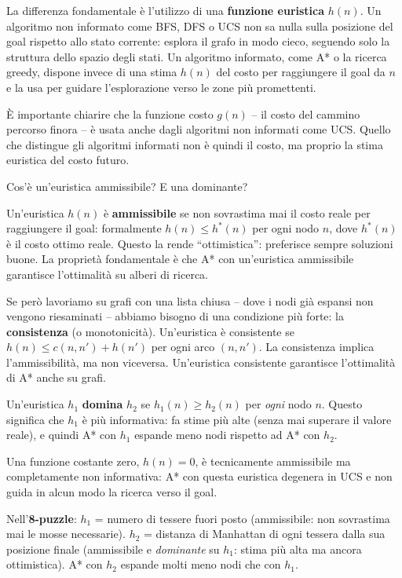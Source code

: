 \documentclass[12pt,a4paper]{article}
\begin{document}
La differenza fondamentale è l'utilizzo di una \textbf{funzione euristica} $h(n)$. Un algoritmo non informato come BFS, DFS o UCS non sa nulla sulla posizione del goal rispetto allo stato corrente: esplora il grafo in modo cieco, seguendo solo la struttura dello spazio degli stati. Un algoritmo informato, come A* o la ricerca greedy, dispone invece di una stima $h(n)$ del costo per raggiungere il goal da $n$ e la usa per guidare l'esplorazione verso le zone più promettenti.

È importante chiarire che la funzione costo $g(n)$ -- il costo del cammino percorso finora -- è usata anche dagli algoritmi non informati come UCS. Quello che distingue gli algoritmi informati non è quindi il costo, ma proprio la stima euristica del costo futuro.

\begin{domandabox}{Cos'è un'euristica ammissibile? E una dominante?}
\end{domandabox}

Un'euristica $h(n)$ è \textbf{ammissibile} se non sovrastima mai il costo reale per raggiungere il goal: formalmente $h(n) \leq h^*(n)$ per ogni nodo $n$, dove $h^*(n)$ è il costo ottimo reale. Questo la rende ``ottimistica'': preferisce sempre soluzioni buone. La proprietà fondamentale è che A* con un'euristica ammissibile garantisce l'ottimalità su alberi di ricerca.

Se però lavoriamo su grafi con una lista chiusa -- dove i nodi già espansi non vengono riesaminati -- abbiamo bisogno di una condizione più forte: la \textbf{consistenza} (o monotonicità). Un'euristica è consistente se $h(n) \leq c(n, n') + h(n')$ per ogni arco $(n, n')$. La consistenza implica l'ammissibilità, ma non viceversa. Un'euristica consistente garantisce l'ottimalità di A* anche su grafi.

Un'euristica $h_1$ \textbf{domina} $h_2$ se $h_1(n) \geq h_2(n)$ per \emph{ogni} nodo $n$. Questo significa che $h_1$ è più informativa: fa stime più alte (senza mai superare il valore reale), e quindi A* con $h_1$ espande meno nodi rispetto ad A* con $h_2$.

Una funzione costante zero, $h(n) = 0$, è tecnicamente ammissibile ma completamente non informativa: A* con questa euristica degenera in UCS e non guida in alcun modo la ricerca verso il goal.

\begin{esempiobox}
Nell'\textbf{8-puzzle}: $h_1$ = numero di tessere fuori posto (ammissibile: non sovrastima mai le mosse necessarie). $h_2$ = distanza di Manhattan di ogni tessera dalla sua posizione finale (ammissibile e \emph{dominante} su $h_1$: stima più alta ma ancora ottimistica). A* con $h_2$ espande molti meno nodi che con $h_1$.
\end{esempiobox}
\end{document}
